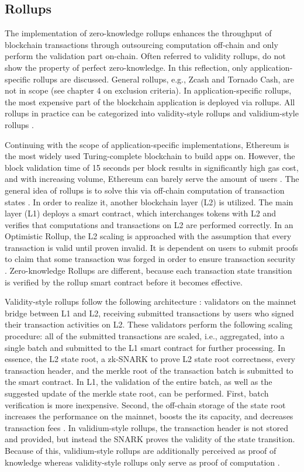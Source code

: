 \subsection{Rollups}
The implementation of zero-knowledge rollups enhances the throughput of blockchain transactions through outsourcing computation off-chain and only perform the validation part on-chain. Often referred to validity rollups, do not show the property of perfect zero-knowledge. In this reflection, only application-specific rollups are discussed. General rollups, e.g., Zcash and Tornado Cash, are not in scope (see chapter 4 on exclusion criteria). In application-specific rollups, the most expensive part of the blockchain application is deployed via rollups. All rollups in practice can be categorized into validity-style rollups and validium-style rollups \citep{chen2022review}.

Continuing with the scope of application-specific implementations, Ethereum is the most widely used Turing-complete blockchain to build apps on. However, the block validation time of 15 seconds per block results in significantly high gas cost, and with increasing volume, Ethereum can barely serve the amount of users \citep{scalingintro}. The general idea of rollups is to solve this via off-chain computation of transaction states \citep{chen2022review}. In order to realize it, another blockchain layer (L2) is utilized. The main layer (L1) deploys a smart contract, which interchanges tokens with L2 and verifies that computations and transactions on L2 are performed correctly. In an Optimistic Rollup, the L2 scaling is approached with the assumption that every transaction is valid until proven invalid. It is dependent on users to submit proofs to claim that some transaction was forged in order to ensure transaction security \citep{zksyncintro}. Zero-knowledge Rollups are different, because each transaction state transition is verified by the rollup smart contract before it becomes effective. 

Validity-style rollups follow the following architecture \citep{buterinrollups}: validators on the mainnet bridge between L1 and L2, receiving submitted transactions by users who signed their transaction activities on L2. These validators perform the following scaling procedure: all of the submitted transactions are scaled, i.e., aggregated, into a single batch and submitted to the L1 smart contract for further processing. In essence, the L2 state root, a zk-SNARK to prove L2 state root correctness, every transaction header, and the merkle root of the transaction batch is submitted to the smart contract. In L1, the validation of the entire batch, as well as the suggested update of the merkle state root, can be performed. First, batch verification is more inexpensive. Second, the off-chain storage of the state root increases the performance on the mainnet, boosts the its capacity, and decreases transaction fees \citep{chen2022review}. In validium-style rollups, the transaction header is not stored and provided, but instead the SNARK proves the validity of the state transition. Because of this, validium-style rollups are additionally perceived as proof of knowledge whereas validity-style rollups only serve as proof of computation \citep{validiumintro}. 

